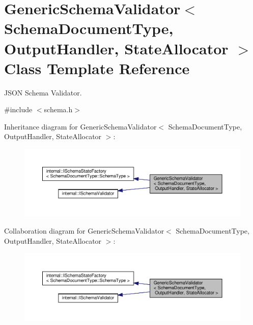 \hypertarget{classGenericSchemaValidator}{}\section{Generic\+Schema\+Validator$<$ Schema\+Document\+Type, Output\+Handler, State\+Allocator $>$ Class Template Reference}
\label{classGenericSchemaValidator}


J\+S\+ON Schema Validator.  




{\ttfamily \#include $<$schema.\+h$>$}



Inheritance diagram for Generic\+Schema\+Validator$<$ Schema\+Document\+Type, Output\+Handler, State\+Allocator $>$\+:
\nopagebreak
\begin{figure}[H]
\begin{center}
\leavevmode
\includegraphics[width=350pt]{classGenericSchemaValidator__inherit__graph}
\end{center}
\end{figure}


Collaboration diagram for Generic\+Schema\+Validator$<$ Schema\+Document\+Type, Output\+Handler, State\+Allocator $>$\+:
\nopagebreak
\begin{figure}[H]
\begin{center}
\leavevmode
\includegraphics[width=350pt]{classGenericSchemaValidator__coll__graph}
\end{center}
\end{figure}

